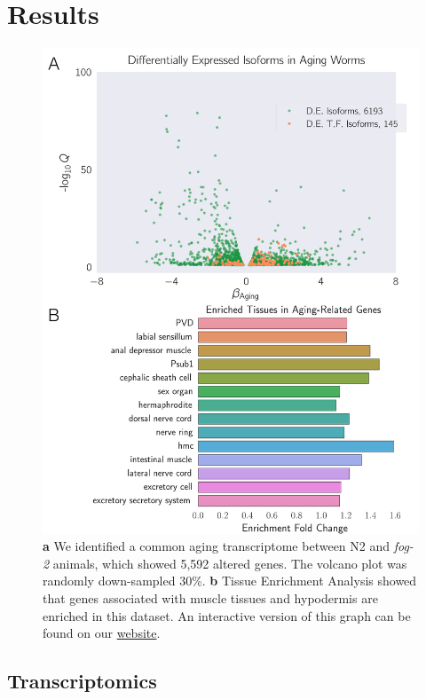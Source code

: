 \documentclass[9pt,twocolumn,twoside]{gsag3jnl}
\newcommand{\fog}{\emph{fog-2}}
\newcommand{\agen}{5,592}
\newcommand{\webref}{
\href{https://wormlabcaltech.github.io/Angeles_Leighton_2016/}{website}}
\begin{document}
\section{Results}
\label{sec:results}
\begin{figure}[htbp]
\renewcommand{\familydefault}{\sfdefault}\normalfont{}
\centering
\includegraphics[width=\linewidth]{../output/figs/final_figs/aging_transcriptomics.pdf}
\caption{\textbf{ a} We identified a common aging transcriptome between N2 and \fog{} animals, which showed \agen{}  altered genes. The volcano plot was randomly down-sampled 30\%. \textbf{b} Tissue Enrichment Analysis showed that genes associated with muscle tissues and hypodermis are enriched in this dataset. An interactive version of this graph can be found on our \webref{}.
}%
\label{fig:agingtranscriptome}
\end{figure}

\subsection*{Transcriptomics}
\label{sub:Transcriptomics}
\end{document}
